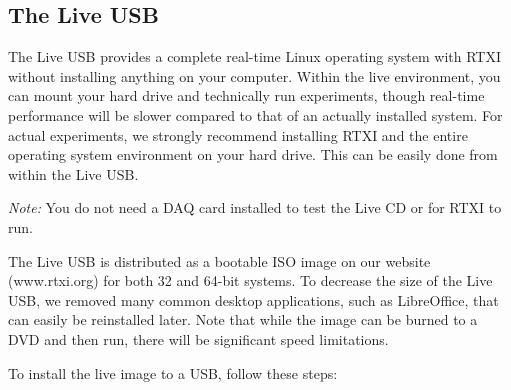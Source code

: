 
\subsection{The Live USB}
\label{easyinstall}

The Live USB provides a complete real-time Linux operating system with RTXI without installing anything on your computer. Within the live environment, you can mount your hard drive and technically run experiments, though real-time performance will be slower compared to that of an actually installed system. For actual experiments, we strongly recommend installing RTXI and the entire operating system environment on your hard drive. This can be easily done from within the Live USB. 

\textit{Note:} You do not need a DAQ card installed to test the Live CD or for RTXI to run.

The Live USB is distributed as a bootable ISO image on our website (www.rtxi.org) for both 32 and 64-bit systems. To decrease the size of the Live USB, we removed many  common desktop applications, such as LibreOffice, that can easily be reinstalled later. Note that while the image can be burned to a DVD and then run, there will be significant speed limitations. 

To install the live image to a USB, follow these steps:

